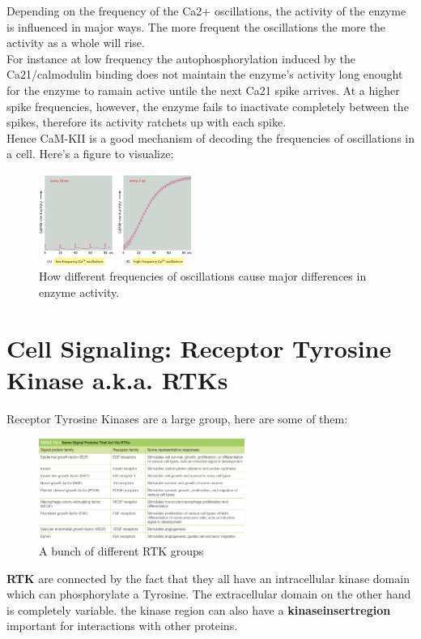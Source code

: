 \documentclass[../main.tex]{subfiles}
\begin{document}
Depending on the frequency of the Ca2+ oscillations, the activity of the enzyme is influenced in major ways. The more frequent the oscillations the more the activity as a whole will rise. \\
For instance at low frequency the autophosphorylation induced by the Ca21/calmodulin binding does not maintain the enzyme's activity long enought for the enzyme to ramain active untile the next Ca21 spike arrives. At a higher spike frequencies, however, the enzyme fails to inactivate completely between the spikes, therefore its activity ratchets up with each spike.\\
Hence CaM-KII is a good mechanism of decoding the frequencies of oscillations in a cell. Here's a figure to visualize:
\begin{figure}[H]
	\centering
	\includegraphics[width=0.45\textwidth]{Ca2_osc}
	\caption{How different frequencies of oscillations cause major differences in enzyme activity.}
\end{figure}





\section{Cell Signaling: Receptor Tyrosine Kinase a.k.a. RTKs}

Receptor Tyrosine Kinases are a large group, here are some of them:
\begin{figure}[H]
	\centering
	\includegraphics[width=0.6\textwidth]{RTk_ex}
	\caption{A bunch of different RTK groups}
\end{figure}

\textbf{\gls{RTK}} are connected by the fact that they all have an intracellular kinase domain which can phosphorylate a Tyrosine. The extracellular domain on the other hand is completely variable. the kinase region can also have a \textbf{\gls{kinaseinsertregion}} important for interactions with other proteins.
\end{document}
